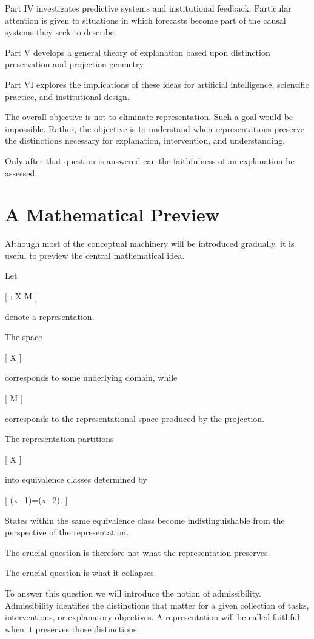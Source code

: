 \documentclass[11pt,oneside,openany]{book}
\begin{document}
Part IV investigates predictive systems and institutional feedback. Particular attention is given to situations in which forecasts become part of the causal systems they seek to describe.

Part V develops a general theory of explanation based upon distinction preservation and projection geometry.

Part VI explores the implications of these ideas for artificial intelligence, scientific practice, and institutional design.

The overall objective is not to eliminate representation. Such a goal would be impossible. Rather, the objective is to understand when representations preserve the distinctions necessary for explanation, intervention, and understanding.

Only after that question is answered can the faithfulness of an explanation be assessed.

\section{A Mathematical Preview}

Although most of the conceptual machinery will be introduced gradually, it is useful to preview the central mathematical idea.

Let

[ \pi : \mathcal X \rightarrow \mathcal M ]

denote a representation.

The space

[ \mathcal X ]

corresponds to some underlying domain, while

[ \mathcal M ]

corresponds to the representational space produced by the projection.

The representation partitions

[ \mathcal X ]

into equivalence classes determined by

[ \pi(x_1)=\pi(x_2). ]

States within the same equivalence class become indistinguishable from the perspective of the representation.

The crucial question is therefore not what the representation preserves.

The crucial question is what it collapses.

To answer this question we will introduce the notion of admissibility. Admissibility identifies the distinctions that matter for a given collection of tasks, interventions, or explanatory objectives. A representation will be called faithful when it preserves those distinctions.
\end{document}
